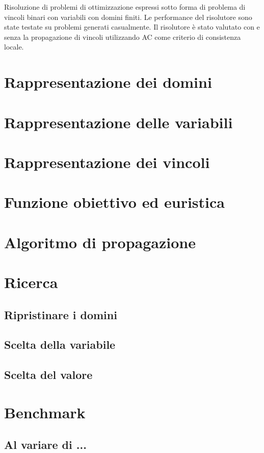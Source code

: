 \documentclass[a4paper,12pt,italian]{article}
\begin{document}
Risoluzione di problemi di ottimizzazione espressi sotto forma di
problema di vincoli binari con variabili con domini finiti. Le
performance del risolutore sono state testate su problemi generati
casualmente. Il risolutore \`e stato valutato con e senza la
propagazione di vincoli utilizzando AC come criterio di consistenza
locale.

\section{Rappresentazione dei domini}

\section{Rappresentazione delle variabili}

\section{Rappresentazione dei vincoli}

\section{Funzione obiettivo ed euristica}

\section{Algoritmo di propagazione}

\section{Ricerca}
\subsection{Ripristinare i domini}
\subsection{Scelta della variabile}
\subsection{Scelta del valore}

\section{Benchmark}

\subsection{Al variare di ...}
\end{document}
